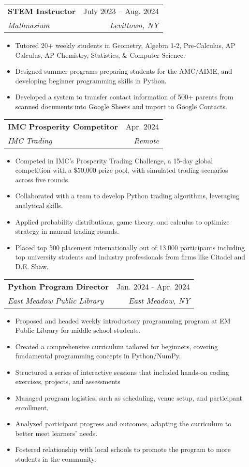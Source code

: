 \documentclass[letterpaper,11pt]{article}
\makeatletter
\newcommand{\resumeItem}[1]{
  \item\small{
    {#1 \vspace{-2pt}}
  }
}
\newcommand{\resumeSubheading}[4]{
  \vspace{-2pt}\item
    \begin{tabular*}{0.97\textwidth}[t]{l@{\extracolsep{\fill}}r}
      \textbf{#1} & #2 \\
      \textit{\small#3} & \textit{\small #4} \\
    \end{tabular*}\vspace{-7pt}
}
\newcommand{\resumeItemListStart}{\begin{itemize}}
\newcommand{\resumeItemListEnd}{\end{itemize}\vspace{-5pt}}
\makeatother
\begin{document}
    \resumeSubheading
      {STEM Instructor}{July 2023 -- Aug. 2024}
      {Mathnasium}{Levittown, NY}
      \resumeItemListStart
        \resumeItem{Tutored 20+ weekly students in Geometry, Algebra 1-2, Pre-Calculus, AP Calculus, AP Chemistry, Statistics, \& Computer Science.
}
        \resumeItem{Designed summer programs preparing students for the AMC/AIME, and developing beginner programming skills in Python.
        }
        \resumeItem{Developed a system to transfer contact information of 500+ parents from scanned documents into Google Sheets and import to Google Contacts.
        }
    \resumeItemListEnd

    \resumeSubheading
      {IMC Prosperity Competitor}{Apr. 2024}
      {IMC Trading}{Remote}
      \resumeItemListStart
        \resumeItem{Competed in IMC's Prosperity Trading Challenge, a 15-day global competition with a \$50,000 prize pool, with simulated trading scenarios across five rounds.
        }
        \resumeItem{Collaborated with a team to develop Python trading algorithms, leveraging analytical skills.
        }
        \resumeItem{Applied probability distributions, game theory, and calculus to optimize strategy in manual trading rounds.
        }
        \resumeItem{
        Placed top 500 placement internationally out of 13,000 participants including top university students and industry professionals from firms like Citadel and D.E. Shaw.
        }
    \resumeItemListEnd
    
    \resumeSubheading
      {Python Program Director}{Jan. 2024 - Apr. 2024}
      {East Meadow Public Library}{East Meadow, NY}
      \resumeItemListStart
        \resumeItem{Proposed and headed weekly introductory programming program at EM Public Library for middle school students.
        }
        \resumeItem{Created a comprehensive curriculum tailored for beginners, covering fundamental programming concepts in Python/NumPy.
        }
        \resumeItem{Structured a series of interactive sessions that included hands-on coding exercises, projects, and assessments
        }
        \resumeItem{Managed program logistics, such as scheduling, venue setup, and participant enrollment.
        }
        \resumeItem{Analyzed participant progress and outcomes, adapting the curriculum to better meet learners' needs.
        }
        \resumeItem{Fostered relationship with local schools to promote the program to more students in the community.
        }
      \resumeItemListEnd
  
\end{document}
